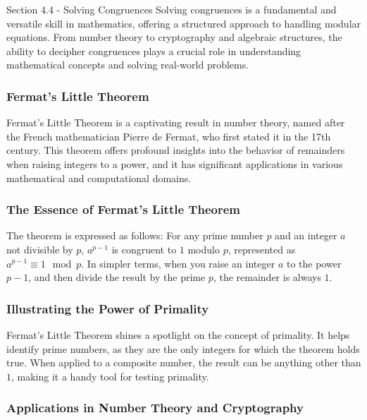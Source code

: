 \begin{notes}{Section 4.4 - Solving Congruences}
    Solving congruences is a fundamental and versatile skill in mathematics, offering a structured approach to handling modular equations. From number theory to cryptography and algebraic structures, 
    the ability to decipher congruences plays a crucial role in understanding mathematical concepts and solving real-world problems.

    \subsubsection*{Fermat's Little Theorem}

    Fermat's Little Theorem is a captivating result in number theory, named after the French mathematician Pierre de Fermat, who first stated it in the 17th century. This theorem offers profound 
    insights into the behavior of remainders when raising integers to a power, and it has significant applications in various mathematical and computational domains.
    
    \subsubsection*{The Essence of Fermat's Little Theorem}
    
    The theorem is expressed as follows: For any prime number \(p\) and an integer \(a\) not divisible by \(p\), \(a^{p-1}\) is congruent to \(1\) modulo \(p\), represented as \(a^{p-1} \equiv 1 \mod p\). 
    In simpler terms, when you raise an integer \(a\) to the power \(p-1\), and then divide the result by the prime \(p\), the remainder is always \(1\).
    
    \subsubsection*{Illustrating the Power of Primality}
    
    Fermat's Little Theorem shines a spotlight on the concept of primality. It helps identify prime numbers, as they are the only integers for which the theorem holds true. When applied to a 
    composite number, the result can be anything other than \(1\), making it a handy tool for testing primality.
    
    \subsubsection*{Applications in Number Theory and Cryptography}


\end{notes}
